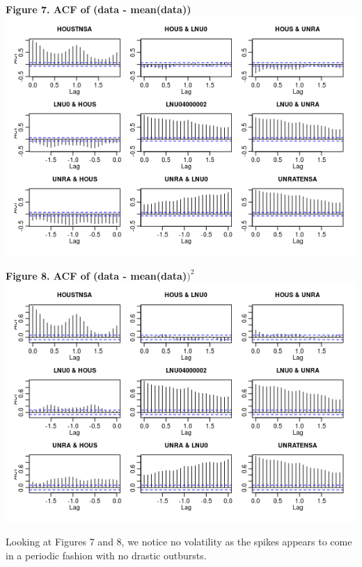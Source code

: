 \documentclass[11pt]{article}
\begin{document}
\begin{center}
\textbf{Figure 7. ACF of (data - mean(data))}
\\
\includegraphics[scale=1]{vol1}
\end{center}

\begin{center}
\textbf{Figure 8. ACF of (data - mean(data)$)^2$}
\\
\includegraphics[scale=1]{vol2}
\end{center}

Looking at Figures 7 and 8, we notice no volatility as the spikes appears to come in a periodic fashion with no drastic outbursts.
\end{document}
